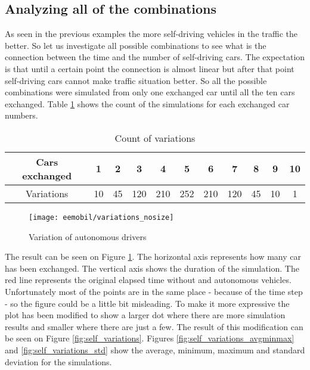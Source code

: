 		\subsection{Analyzing all of the combinations}
		As seen in the previous examples the more self-driving vehicles in the traffic the better. So let us investigate all possible combinations to see what is the connection between the time and the number of self-driving cars. The expectation is that until a certain point the connection is almost linear but after that point self-driving cars cannot make traffic situation better.
		So all the possible combinations were simulated from only one exchanged car until all the ten cars exchanged. Table \ref{tab:all_variations} shows the count of the simulations for each exchanged car numbers.
		\begin{table}[ht]
			\begin{center}
				\begin{tabular}{ |c||c|c|c|c|c|c|c|c|c|c| }
					\hline
					Cars exchanged & 1   & 2    & 3    & 4     & 5      & 6     & 7     & 8   & 9   & 10\\
					\hline
					Variations            & 10 & 45 & 120 & 210 & 252 & 210 & 120 & 45 & 10 & 1\\
					\hline
				\end{tabular}
			\end{center}
			\caption{Count of variations}
			\label{tab:all_variations}
		\end{table}
		\begin{figure}
			\centering
			\texttt{[image: eemobil/variations\_nosize]}
			\caption{Variation of autonomous drivers}
			\label{fig:self_variations_nosize}
		\end{figure}

		The result can be seen on Figure \ref{fig:self_variations_nosize}. The horizontal axis represents how many car has been exchanged. The vertical axis shows the duration of the simulation. The red line represents the original elapsed time without and autonomous vehicles. Unfortunately most of the points are in the same place - because of the time step - so the figure could be a little bit misleading. To make it more expressive the plot has been modified to show a larger dot where there are more simulation results and smaller where there are just a few. The result of this modification can be seen on Figure \ref{fig:self_variations}. Figures \ref{fig:self_variations_avgminmax} and \ref{fig:self_variations_std} show the average, minimum, maximum and standard deviation for the simulations.
		
